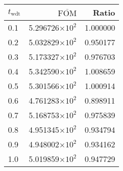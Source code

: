 \begin{tabular}{lrr}
\toprule
$t_{\mathrm{wdt}}$ & $\overline{\mathrm{FOM}}$ &    Ratio \\
\midrule
               0.1 &   5.296726$\times 10^{2}$ & 1.000000 \\
               0.2 &   5.032829$\times 10^{2}$ & 0.950177 \\
               0.3 &   5.173327$\times 10^{2}$ & 0.976703 \\
               0.4 &   5.342590$\times 10^{2}$ & 1.008659 \\
               0.5 &   5.301566$\times 10^{2}$ & 1.000914 \\
               0.6 &   4.761283$\times 10^{2}$ & 0.898911 \\
               0.7 &   5.168753$\times 10^{2}$ & 0.975839 \\
               0.8 &   4.951345$\times 10^{2}$ & 0.934794 \\
               0.9 &   4.948002$\times 10^{2}$ & 0.934162 \\
               1.0 &   5.019859$\times 10^{2}$ & 0.947729 \\
\bottomrule
\end{tabular}
